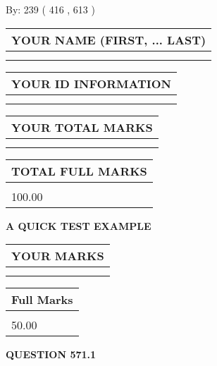 \documentclass[12pt]{article}
\begin{document}
   
\hspace{1.0in} By: 
 239 ( 416 ,  613 )
   
   
   
   
\newpage 
\setcounter{page}{ 
   571001 } 
   
   
   
   
\noindent\begin{tabular}{|l|}
\hline
YOUR NAME (FIRST, ... LAST)  \\
\hline
 \\ 
 \\ 
\hline
\end{tabular}
\hspace{0.05in} \begin{tabular}{|l|}
\hline
 YOUR   ID   INFORMATION  \\
\hline
 \\ 
 \\ 
\hline
\end{tabular}
   
   
\vspace{0.2in}\noindent\begin{tabular}{|l|}
\hline
YOUR TOTAL MARKS  \\
\hline
 \\ 
 \\ 
\hline
\end{tabular}
\hspace{0.05in} \begin{tabular}{|l|}
\hline
TOTAL FULL MARKS  \\
\hline
 \\ 
100.00 \\
\hline
\end{tabular}
   
   
 \vspace{0.2in}
{\LARGE {\textbf{ A QUICK TEST EXAMPLE}}}
   
   
  
\vspace{0.2in}
  
\noindent\begin{tabular}{|l|}
\hline
 YOUR MARKS  \\
\hline
 \\ 
 \\ 
\hline
\end{tabular}
\hspace{0.05in} \begin{tabular}{|l|}
\hline
 Full Marks  \\
\hline
 \\ 
50.00 \\
\hline
\end{tabular}
{\textbf{\Large{QUESTION
571.1 
}}}
  
\end{document}
